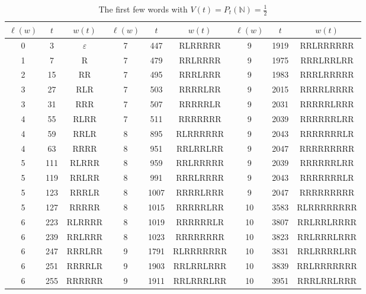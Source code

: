 \documentclass[10pt]{amsart}
\theoremstyle{definition}
\numberwithin{equation}{section}
\newcommand{\N}{\mathbb{N}}
\begin{document}
\begin{table}[h]
\centering
\scriptsize
\setlength{\tabcolsep}{3pt}
\begin{tabular}{c c c|c c c|ccc}
\midrule
$\ell(w)$ & $t$ & $w(t)$ & $\ell(w)$ & $t$ & $w(t)$ & $\ell(w)$ & $t$ & $w(t)$ \\
\midrule

0 & 3   & $\varepsilon$ & 7 & 447  & RLRRRRR   & 9 & 1919 & RRLRRRRRR  \\
1 & 7   & R             & 7 & 479  & RRLRRRR   & 9 & 1975 & RRRLRRLRR  \\
2 & 15  & RR            & 7 & 495  & RRRLRRR   & 9 & 1983 & RRRLRRRRR \\
3 & 27  & RLR           & 7 & 503  & RRRRLRR   & 9 & 2015 & RRRRLRRRR \\
3 & 31  & RRR           & 7 & 507  & RRRRRLR   & 9 &  2031 & RRRRRLRRR \\
4 & 55  & RLRR          & 7 & 511  & RRRRRRR   & 9 & 2039 & RRRRRRLRR\\
4 & 59  & RRLR          & 8 & 895  & RLRRRRRR  & 9 & 2043 & RRRRRRRLR \\
4 & 63  & RRRR          & 8 & 951  & RRLRRLRR  & 9 &  2047 & RRRRRRRRR \\
5 & 111 & RLRRR         & 8 & 959  & RRLRRRRR  & 9 & 2039 & RRRRRRLRR \\
5 & 119 & RRLRR         & 8 & 991  & RRRLRRRR  & 9 & 2043 & RRRRRRRLR \\
5 & 123 & RRRLR         & 8 & 1007 & RRRRLRRR  & 9 & 2047 & RRRRRRRRR \\
5 & 127 & RRRRR         & 8 & 1015 & RRRRRLRR  &   10 & 3583 & RLRRRRRRRR       \\
6 & 223 & RLRRRR        & 8 & 1019 & RRRRRRLR  &   10 & 3807 & RRLRRLRRRR         \\
6 & 239 & RRLRRR        & 8 & 1023 & RRRRRRRR  &  10 & 3823 & RRLRRRLRRR           \\
6 & 247 & RRRLRR        &    9 & 1791 & RLRRRRRRR          &  10 & 3831 & RRLRRRRLRR           \\
6 & 251 & RRRRLR        &     9 & 1903 & RRLRRLRRR          &   10 & 3839 & RRLRRRRRRR           \\
6 & 255 & RRRRRR        &     9 & 1911 & RRLRRRLRR      &   10 & 3951 & RRRLRRLRRR           \\

\bottomrule
\end{tabular}
\caption{The first few words with $V(t)=P_t(\N)=\frac12$  }
\end{table}
\end{document}
